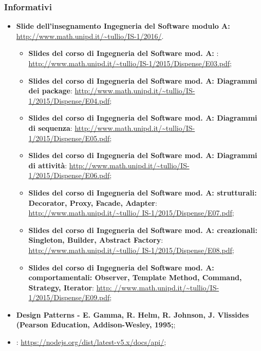 \subsubsection{Informativi}
\begin{itemize}
	\item \textbf{Slide dell'insegnamento Ingegneria del Software modulo A:} \\
		\url{http://www.math.unipd.it/~tullio/IS-1/2016/}. \\
\begin{itemize}
\item \textbf{Slides del corso di Ingegneria del Software mod. A: }:
\url{http://www.math.unipd.it/~tullio/IS-1/2015/Dispense/E03.pdf};

\item  \textbf{Slides del corso di Ingegneria del Software mod. A: Diagrammi dei package}:
\url{http://www.math.unipd.it/~tullio/IS-1/2015/Dispense/E04.pdf};

\item \textbf{Slides del corso di Ingegneria del Software mod. A: Diagrammi di sequenza}:
\url{http://www.math.unipd.it/~tullio/IS-1/2015/Dispense/E05.pdf};

\item \textbf{Slides del corso di Ingegneria del Software mod. A: Diagrammi di attività}:
\url{http://www.math.unipd.it/~tullio/IS-1/2015/Dispense/E06.pdf};

\item \textbf{Slides del corso di Ingegneria del Software mod. A:  strutturali:
Decorator, Proxy, Facade, Adapter}:\url{ http://www.math.unipd.it/~tullio/
IS-1/2015/Dispense/E07.pdf};

\item \textbf{Slides del corso di Ingegneria del Software mod. A:  creazionali:
Singleton, Builder, Abstract Factory}: \url{http://www.math.unipd.it/~tullio/
IS-1/2015/Dispense/E08.pdf};

\item \textbf{Slides del corso di Ingegneria del Software mod. A:  comportamentali:
Observer, Template Method, Command, Strategy, Iterator}: \url{http:
//www.math.unipd.it/~tullio/IS-1/2015/Dispense/E09.pdf};
\end{itemize}

\item \textbf{Design Patterns - E. Gamma, R. Helm, R. Johnson, J. Vlissides (Pearson Education, Addison-Wesley, 1995;};
\item \textbf{}: \url{https://nodejs.org/dist/latest-v5.x/docs/api/};


\end{itemize}
